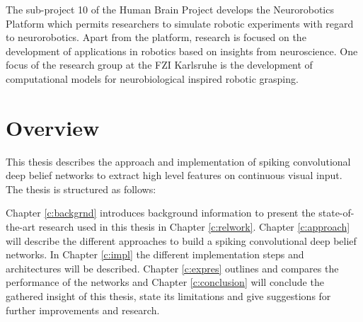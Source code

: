 The sub-project 10 of the Human Brain Project develops the Neurorobotics Platform which
permits researchers to simulate robotic experiments with regard to neurorobotics. Apart from the
platform, research is focused on the development of applications in robotics based on insights
from neuroscience. One focus of the research group at the FZI Karlsruhe is the development of
computational models for neurobiological inspired robotic grasping.


\section{Overview} \label{c:overw}

This thesis describes the approach and implementation of spiking convolutional deep belief networks to extract high level features on continuous visual input. The thesis is structured as follows:

Chapter \ref{c:backgrnd} introduces background information to present the state-of-the-art research used in this thesis in Chapter \ref{c:relwork}. 
Chapter \ref{c:approach} will describe the different approaches to build a spiking convolutional deep belief networks. 
In Chapter \ref{c:impl} the different implementation steps and architectures will be described. 
Chapter \ref{c:expres} outlines and compares the performance of the networks and 
Chapter \ref{c:conclusion} will conclude the gathered insight of this thesis, state its limitations and give suggestions for further improvements and research.  